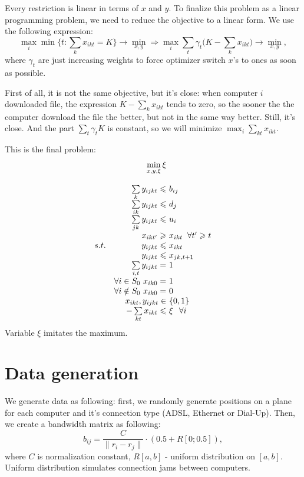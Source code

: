 \documentclass[10pt,a4paper]{article}
\begin{document}
Every restriction is linear in terms of $x$ and $y$. To finalize this problem as a linear programming problem, we need to reduce the objective to a linear form. We use the following expression:
\begin{equation}
	\max_{i} \min \{t: \sum_k x_{ikt} = K \} \to \min_{x,y} \Rightarrow \max_i \sum_t \gamma_t\Big( K - \sum_k x_{ikt} \Big) \to \min_{x, y},
\end{equation}
where $\gamma_t$ are just increasing weights to force optimizer switch $x$'s to ones as soon as possible.

First of all, it is not the same objective, but it's close: when computer $i$ downloaded file, the expression $K - \sum_k x_{ikt}$ tends to zero, so the sooner the the computer download the file the better, but not in the same way better. Still, it's close. And the part $\sum_t \gamma_t K$ is constant, so we will minimize $\max_i \sum_{kt} x_{ikt}$.

This is the final problem:
\begin{align*}
	\begin{array}{rrll}
	& \min\limits_{x, y, \xi} \xi \\ 
	\ \\
	& \sum\limits_k y_{ijkt} \leqslant & \mkern-12mu b_{ij} \\ 
	& \sum\limits_{ik} y_{ijkt} \leqslant & \mkern-12mu d_j \\ 
	& \sum\limits_{jk} y_{ijkt} \leqslant & \mkern-12mu u_i \\ 
	& x_{ikt'} \geqslant & \mkern-12mu x_{ikt} & \mkern-32mu \forall t' \geqslant t  \\ 
	s. t. & y_{ijkt} \leqslant & \mkern-12mu x_{ikt} \\
	& y_{ijkt} \leqslant & \mkern-12mu x_{jk,t+1} \\
	& \sum\limits_{i,t} y_{ijkt} = & \mkern-12mu 1 \\
	& \forall i \in S_0 \ x_{ik0} = & \mkern-12mu 1 \\
	& \forall i \notin S_0 \ x_{ik0} = & \mkern-12mu 0 \\	
	& x_{ikt}, y_{ijkt} \in & \mkern-12mu \{0, 1 \} \\
	& -\sum\limits_{kt} x_{ikt} \leqslant & \mkern-12mu \xi & \mkern-50mu \forall i
	\end{array} 
\end{align*}
Variable $\xi$ imitates the maximum.

\section*{Data generation}
We generate data as following: first, we randomly generate positions on a plane for each computer and it's connection type (ADSL, Ethernet or Dial-Up). Then, we create a bandwidth matrix as following:
\begin{equation}
	b_{ij} =  \frac{C}{\|r_i - r_j \|} \cdot ( 0.5 + R[0;0.5]),
\end{equation}
where $C$ is normalization constant, $R[a, b]$ - uniform distribution on $[a, b]$. Uniform distribution simulates connection jams between computers.
\end{document}
